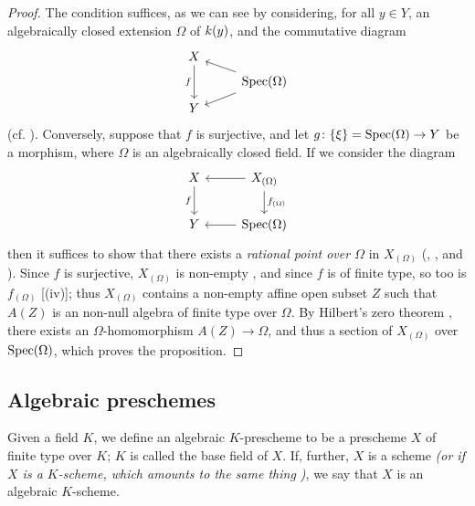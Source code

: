 \begin{proof}
\label{proof-1.6.3.10}
The condition suffices, as we can see by considering, for all $y\in Y$, an algebraically closed extension $\Omega$ of $k(y)$, and the commutative diagram
\begin{equation*}
    \begin{tikzcd}[row sep=tiny]
        X \ar[dd,swap,"f"]&\\
        &\Spec(\Omega) \ar[ul] \ar[dl]\\
        Y&
    \end{tikzcd}
\end{equation*}
(cf. ).
Conversely, suppose that $f$ is surjective, and let $g\colon\{\xi\}={\mathop{\mathrm{Spec}}\nolimits}(\Omega)\to Y$ be a morphism, where $\Omega$ is an algebraically closed field.
If we consider the diagram
\begin{equation*}
    \begin{tikzcd}
        X \ar[d,swap,"f"]
        & X_{(\Omega)} \ar[l] \ar[d,"f_{(\Omega)}"]\\
        Y
        & \Spec(\Omega) \ar[l]
    \end{tikzcd}
\end{equation*}
then it suffices to show that there exists a \emph{rational point over $\Omega$} in $X_{(\Omega)}$ (, , and ).
Since $f$ is surjective, $X_{(\Omega)}$ is non-empty , and since $f$ is of finite type, so too is $f_{(\Omega)}$ [(iv)];
thus $X_{(\Omega)}$ contains a non-empty affine open subset $Z$ such that $A(Z)$ is an non-null algebra of finite type over $\Omega$.
By Hilbert's zero theorem \cite{I-21}, there exists an $\Omega$-homomorphism $A(Z)\to\Omega$, and thus a section of $X_{(\Omega)}$ over ${\mathop{\mathrm{Spec}}\nolimits}(\Omega)$, which proves the proposition.
\end{proof}

\subsection{Algebraic preschemes}
\label{subsection-algebraic-preschemes}

\begin{defn}[6.4.1]
\label{1.6.4.1}
Given a field $K$, we define an algebraic $K$-prescheme to be a prescheme $X$ of finite type over $K$;
$K$ is called the base field of $X$.
If, further, $X$ is a scheme \emph{(or if $X$ is a \emph{$K$-scheme}, which amounts to the same thing )}, we say that $X$ is an algebraic $K$-scheme.
\end{defn}

